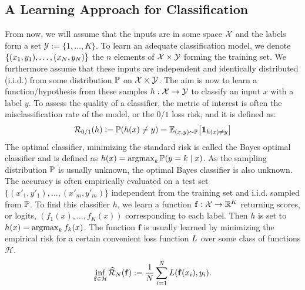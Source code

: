 \subsection{A Learning Approach for Classification}
From now, we will assume that the inputs are in some space $\mathcal{X}$ and the labels form a set $\mathcal{Y}:=\{1,\dots,K\}$. To learn an adequate classification model, we denote $\{(x_1,y_1),\dots,(x_N,y_N)\}$ the $n$ elements of $\mathcal{X}\times\mathcal{Y}$ forming the training set. We furthermore assume that these inputs are independent and identically distributed (i.i.d.) from some distribution $\mathbb{P}$ on $\mathcal{X}\times\mathcal{Y}$. The aim is now to learn a function/hypothesis from these samples $h:\mathcal{X}\to\mathcal{Y}$ to classify an input $x$ with a label $y$. To assess the quality of a classifier, the metric of interest is often the misclassification rate of the model, or the $0/1$ loss risk, and it is defined as:
\begin{align*}
\risk_{0/1}(h):=\PP(h(x)\neq y) = \EE_{(x,y)\sim\PP}\left[\mathbf{1}_{h(x)\neq y}\right]
\end{align*}
The optimal classifier, minimizing the standard risk is called the Bayes optimal classifier and is defined as $h(x) = \operatorname*{argmax}_k\mathbb{P}(y=k\mid x)$.
As the sampling distribution $\mathbb{P}$ is usually unknown, the optimal Bayes classifier is also unknown. The accuracy is often empirically evaluated on a test set $\{(x'_1,y'_1),\dots,(x'_m,y'_m)\}$ independent from the training set and i.i.d. sampled from $\mathbb{P}$.  To find this classifier $h$, we learn a function $\mathbf{f}:\mathcal{X}\to\mathbb{R}^K$ returning scores, or logits, $(f_1(x),\dots,f_K(x))$ corresponding to each label. Then $h$ is set to $h(x)=\operatorname*{argmax}_k f_k(x)$. The function $\mathbf{f}$ is usually learned by minimizing the empirical risk for a certain convenient loss function $L$ over some class of functions $\mathcal{H}$.
\begin{align*}
\inf_{\mathbf{f}\in\mathcal{H}}\widehat{\mathcal{R}}_{N}(\mathbf{f}):= \frac{1}{N}\sum_{i=1}^N L(\mathbf{f}(x_i),y_i).
\end{align*}

